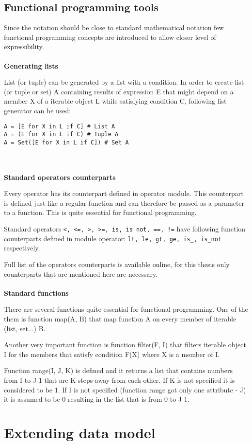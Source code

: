 \documentclass[11pt,oneside]{fithesis2}
\newcommand{\markit}[1]{\ \\\\{\noindent\textbf{#1}}}
\newcommand{\T}[1]{\texttt{#1}}
\begin{document}
\section{Functional programming tools}
Since the notation should be close to standard mathematical notation few functional programming concepts are introduced to allow closer level of expressibility.
\markit{Generating lists}

List (or tuple) can be generated by a list with a condition. In order to create list (or tuple or set) A containing results of expression E that might depend on a member X of a iterable object L while satisfying condition C, following list generator can be used:
\begin{lstlisting}
A = [E for X in L if C] # List A
A = (E for X in L if C) # Tuple A
A = Set([E for X in L if C]) # Set A
\end{lstlisting}
\markit{Standard operators counterparts}

Every operator has its counterpart defined in operator module. This counterpart is defined just like a regular function and can therefore be passed as a parameter to a function. This is quite essential for functional programming.

Standard operators \T{<, <=, >, >=, is, is not, ==, !=} have following function counterparts defined in module operator: \T{lt, le, gt, ge, is\_, is\_not} respectively.

Full list of the operators counterparts is available online\cite{operators}, for this thesis only counterparts that are mentioned here are necessary.
\markit{Standard functions}

There are several functions quite essential for functional programming. One of the them is function map(A, B) that map function A on every member of iterable (list, set...) B.

Another very important function is function filter(F, I) that filters iterable object I for the members that satisfy condition F(X) where X is a member of I.

Function range(I, J, K) is defined and it returns a list that contains numbers from I to J-1 that are K steps away from each other. If K is not specified it is considered to be 1. If I is not specified (function range got only one attribute - J) it is assumed to be 0 resulting in the list that is from 0 to J-1.


\chapter{Extending data model}
\end{document}
